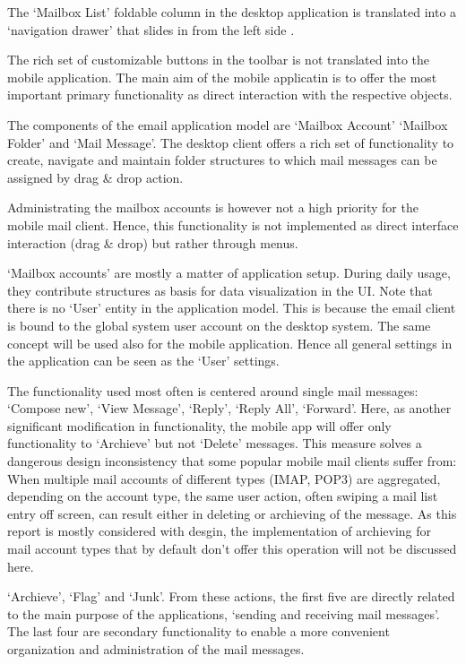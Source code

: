 \documentclass[a4paper,11pt,twoside]{article}
\begin{document}
The `Mailbox List' foldable column in the desktop application is translated into
a `navigation drawer' that slides in from the left side \cite{navigation_drawer}.

The rich set of customizable buttons in the toolbar is not translated into the
mobile application. The main aim of the mobile applicatin is to offer the most
important primary functionality as direct interaction with the respective objects.



The components of the email application model are `Mailbox Account'
`Mailbox Folder' and `Mail Message'. The desktop client offers a rich set of
functionality to create, navigate and maintain folder structures to which mail
messages can be assigned by drag & drop action.

Administrating the mailbox accounts is however not a high priority for the
mobile mail client. Hence, this functionality is not implemented as direct
interface interaction (drag & drop) but rather through menus.

`Mailbox accounts' are mostly a matter of application setup. During daily usage,
they contribute structures as basis for data visualization in the UI. Note that
there is no `User' entity in the application model. This is because the email
client is bound to the global system user account on the desktop system. The
same concept will be used also for the mobile application. Hence all general
settings in the application can be seen as the `User' settings.

The functionality used most often is centered around single mail messages:
`Compose new', `View Message', `Reply', `Reply All', `Forward'. Here, as another
significant modification in functionality, the mobile app will offer
only functionality to `Archieve' but not `Delete' messages. This measure  solves
a dangerous design inconsistency that some popular mobile mail clients  suffer
from: When multiple mail accounts of different types (IMAP, POP3) are
aggregated, depending on the account type, the same user action,  often swiping
a mail list entry off screen, can result either in deleting or archieving of the
message. As this report is mostly considered with desgin, the  implementation of
archieving for mail account types that by default don't offer this operation will
not be discussed here.


`Archieve', `Flag' and `Junk'. From these actions, the first five are directly
related to the main purpose of the applications, `sending and receiving mail
messages'. The last four are secondary functionality to enable a more convenient
organization and administration of the mail messages.
\end{document}
